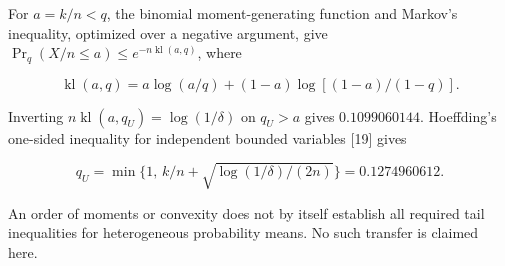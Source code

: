 \documentclass[
  10pt,
]{article}
\begin{document}
For \(a=k/n<q\), the binomial moment-generating function and Markov's
inequality, optimized over a negative argument, give
\(\Pr_q(X/n\le a)\le e^{-n\operatorname{kl}(a,q)}\), where

\[\operatorname{kl}(a,q)=a\log(a/q)+(1-a)\log[(1-a)/(1-q)].\]

Inverting \(n\operatorname{kl}(a,q_U)=\log(1/\delta)\) on \(q_U>a\)
gives \(0.1099060144\). Hoeffding's one-sided inequality for independent
bounded variables {[}19{]} gives

\[q_U=\min\{1,\,k/n+\sqrt{\log(1/\delta)/(2n)}\}=0.1274960612.\]

An order of moments or convexity does not by itself establish all
required tail inequalities for heterogeneous probability means. No such
transfer is claimed here.
\end{document}
